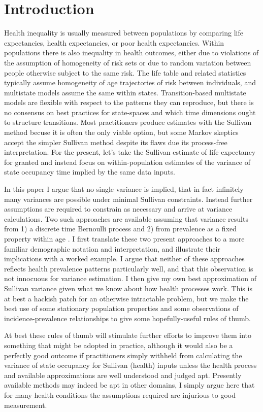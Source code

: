 \documentclass[a4paper]{article}
\begin{document}
\section*{Introduction}
Health inequality is usually measured between populations by comparing life expectancies, health expectancies, or poor health expectancies. Within populations there is also inequality in health outcomes, either due to violations of the assumption of homogeneity of risk sets or due to random variation between people otherwise subject to the same risk. The life table and related statistics typically assume homogeneity of age trajectories of risk between individuals, and multistate models assume the same within states. Transition-based multistate models are flexible with respect to the patterns they can reproduce, but there is no consensus on best practices for state-spaces and which time dimensions ought to structure transitions. Most practitioners produce estimates with the Sullivan method \citep{sullivan1971single} becuse it is often the only viable option, but some Markov skeptics accept the simpler Sullivan method despite its flaws due its process-free interpretation. For the present, let's take the Sullivan estimate of life expectancy for granted and instead focus on within-population estimates of the variance of state occupancy time implied by the same data inputs. 

In this paper I argue that no single variance is implied, that in fact infinitely many variances are possible under minimal Sullivan constraints. Instead further assumptions are required to constrain as necessary and arrive at variance calculations. Two such approaches are available assuming that variance results from 1) a discrete time Bernoulli process and 2) from prevalence as a fixed property within age \citep{caswell2018matrix}. I first translate these two present approaches to a more familiar demographic notation and interpretation, and illustrate their implications with a worked example. I argue that neither of these approaches reflects health prevalence patterns particularly well, and that this observation is not innocuous for variance estimation. I then give my own best approximation of Sullivan variance given what we know about how health processes work. This is at best a hackish patch for an otherwise intractable problem, but we make the best use of some stationary population properties and some observations of incidence-prevalence relationships to give some hopefully-useful rules of thumb. 

At best these rules of thumb will stimulate further efforts to improve them into something that might be adopted in practice, although it would also be a perfectly good outcome if practitioners simply withheld from calculating the variance of state occupancy for Sullivan (health) inputs unless the health process and available approximations are well understood and judged apt. Presently available methods may indeed be apt in other domains, I simply argue here that for many health conditions the assumptions required are injurious to good measurement.
\end{document}
